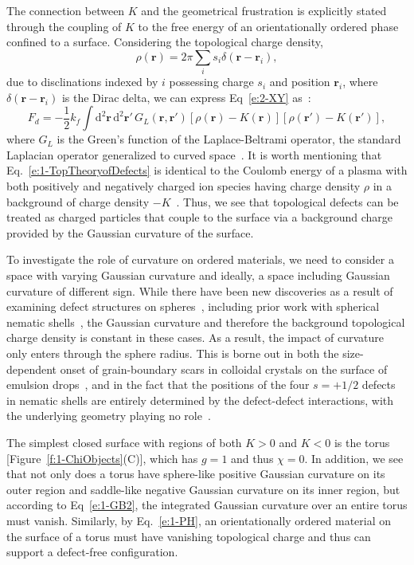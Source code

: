 The connection between $K$ and the geometrical frustration is explicitly stated through the coupling of $K$ to the free energy of an orientationally ordered phase confined to a surface.
Considering the topological charge density,
\begin{equation}
  \rho(\mathbf{r}) = 2 \pi \sum\limits_i s_{i}\delta(\mathbf{r} - \mathbf{r}_{i}),\label{e:1-ChargeDens}
\end{equation}
due to disclinations indexed by $i$ possessing charge $s_{i}$ and position $\mathbf{r}_{i}$, where $\delta(\mathbf{r} - \mathbf{r}_{i})$ is the Dirac delta, we can express Eq~\ref{e:2-XY} as~\cite{RN42,RN175,RN17}:
\begin{equation}
  F_d = -\frac{1}{2} k_f \int \textrm{d}^2\mathbf{r} \, \textrm{d}^2\mathbf{r}' \, G_L(\mathbf{r},\mathbf{r}') [\rho(\mathbf{r})-K(\mathbf{r})] [\rho(\mathbf{r}')-K(\mathbf{r}')],\label{e:1-TopTheoryofDefects}
\end{equation}
where $G_L$ is the Green's function of the Laplace-Beltrami operator, the standard Laplacian operator generalized to curved space~\cite{RN17}.
It is worth mentioning that Eq.~\ref{e:1-TopTheoryofDefects} is identical to the Coulomb energy of a plasma with both positively and negatively charged ion species having charge density $\rho$ in a background of charge density $-K$~\cite{RN17}.
Thus, we see that topological defects can be treated as charged particles that couple to the surface via a background charge provided by the Gaussian curvature of the surface.

To investigate the role of curvature on ordered materials, we need to consider a space with varying Gaussian curvature and ideally, a space including Gaussian curvature of different sign.
While there have been new discoveries as a result of examining defect structures on spheres~\cite{RN106,RN26,RN110,RN76,RN101,RN165}, including prior work with spherical nematic shells~\cite{RN45,RN105}, the Gaussian curvature and therefore the background topological charge density is constant in these cases.
As a result, the impact of curvature only enters through the sphere radius.
This is borne out in both the size-dependent onset of grain-boundary scars in colloidal crystals on the surface of emulsion drops~\cite{RN26,RN110}, and in the fact that the positions of the four $s = +1/2$ defects in nematic shells are entirely determined by the defect-defect interactions, with the underlying geometry playing no role~\cite{RN45}.

The simplest closed surface with regions of both $K>0$ and $K<0$ is the torus [Figure~\ref{f:1-ChiObjects}(C)], which has $g = 1$ and thus $\chi = 0$.
In addition, we see that not only does a torus have sphere-like positive Gaussian curvature on its outer region and saddle-like negative Gaussian curvature on its inner region, but according to Eq~\ref{e:1-GB2}, the integrated Gaussian curvature over an entire torus must vanish.
Similarly, by Eq.~\ref{e:1-PH}, an orientationally ordered material on the surface of a torus must have vanishing topological charge and thus can support a defect-free configuration.

